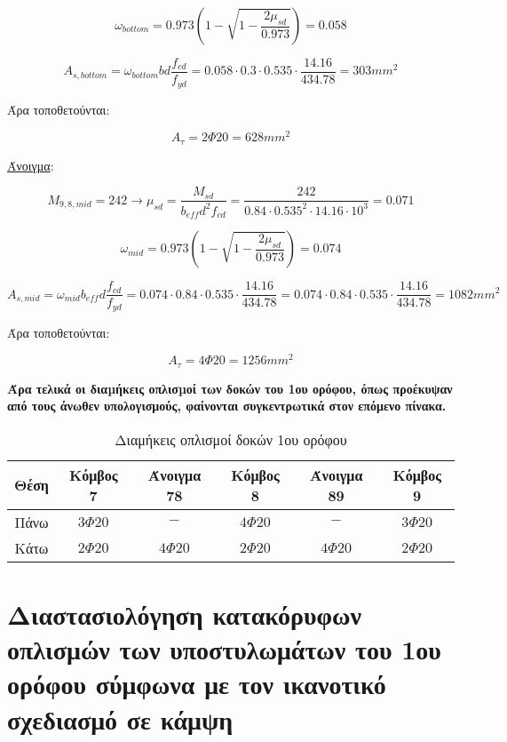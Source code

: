 \[
\omega_{bottom} = 0.973\left( 1 - \sqrt{1 - \dfrac{2\mu_{sd}}{0.973}} \right) = 0.058
\]

\[
A_{s,bottom} = \omega_{bottom}b d \dfrac{f_{cd}}{f_{yd}} = 0.058\cdot 0.3 \cdot 0.535 \cdot \dfrac{14.16}{434.78} = 303mm^2
\]

\noindent
Άρα τοποθετούνται:

\[
A_{\tau} = 2\Phi20 = 628mm^2
\]

\noindent
\underline{Άνοιγμα}:

\bigskip

\[
M_{9,8,mid} = 242 \rightarrow \mu_{sd} = \dfrac{M_{sd}}{b_{eff} d^2 f_{cd}} = \dfrac{242}{0.84\cdot0.535^2\cdot14.16\cdot10^3} = 0.071
\]

\[
\omega_{mid} = 0.973\left( 1 - \sqrt{1 - \dfrac{2\mu_{sd}}{0.973}} \right) = 0.074
\]

\[
A_{s,mid} = \omega_{mid}b_{eff} d \dfrac{f_{cd}}{f_{yd}} = 0.074\cdot 0.84 \cdot 0.535 \cdot \dfrac{14.16}{434.78} = 0.074\cdot 0.84 \cdot 0.535 \cdot \dfrac{14.16}{434.78} = 1082 mm^2
\]

\noindent
Άρα τοποθετούνται:

\[
A_{\tau} = 4\Phi20 = 1256 mm^2
\]

\bigskip

\noindent\textbf{\textcolor{mygreen}{Άρα τελικά οι διαµήκεις οπλισµοί των δοκών του 1ου ορόφου, όπως προέκυψαν από τους άνωθεν υπολογισμούς, φαίνονται συγκεντρωτικά στον επόμενο πίνακα.}}

\begin{table}[h]
\centering\footnotesize
\begin{tabular}{| c || c | c | c | c | c |}
\hline
Θέση & Κόμβος 7 & Άνοιγμα 78 & Κόμβος 8 & Άνοιγμα 89 & Κόμβος 9 \\
\hline
\hline
Πάνω & $3\Phi20$ & $-$ & $4\Phi20$ & $-$ & $3\Phi20$ \\
\hline
Κάτω & $2\Phi20$ & $4\Phi20$ & $2\Phi20$ & $4\Phi20$ & $2\Phi20$ \\
\hline
\end{tabular}
\caption{Διαμήκεις οπλισμοί δοκών 1ου ορόφου}
\label{tab:beamrebar}
\end{table}

\section{Διαστασιολόγηση κατακόρυφων οπλισμών των υποστυλωμάτων του 1ου ορόφου σύμφωνα με τον ικανοτικό σχεδιασμό σε κάμψη}
